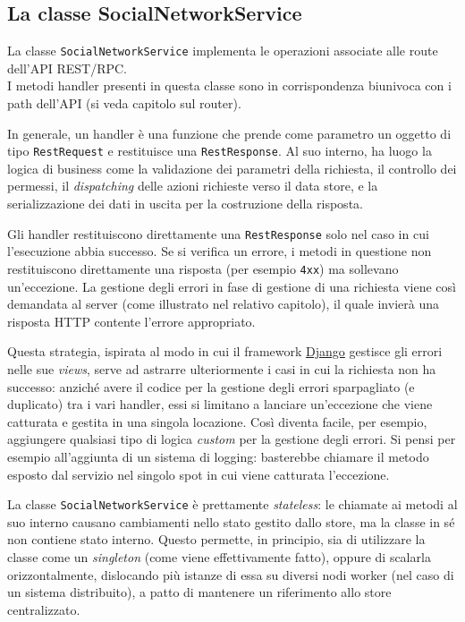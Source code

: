 \documentclass[a4paper,8pt]{article} %
\def\code#1{\texttt{#1}}
\begin{document}
\subsection{La classe SocialNetworkService}
La classe \code{SocialNetworkService} implementa le operazioni associate alle route dell'API REST/RPC.\\ I metodi handler presenti in questa classe
sono in corrispondenza biunivoca con i path dell'API (si veda capitolo sul router).

\par In generale, un handler è una funzione che prende come parametro un oggetto di tipo \code{RestRequest} e restituisce una \code{RestResponse}. Al suo interno,
ha luogo la logica di business come la validazione dei parametri della richiesta, il controllo dei permessi, il \emph{dispatching} delle azioni richieste verso il data store, e la
serializzazione dei dati in uscita per la costruzione della risposta.

\par Gli handler restituiscono direttamente una \code{RestResponse} solo nel caso in cui l'esecuzione abbia successo. Se si verifica un errore, i metodi in questione non restituiscono
direttamente una risposta (per esempio \code{4xx}) ma sollevano un'eccezione. La gestione degli errori in fase di gestione di una richiesta viene così demandata
al server (come illustrato nel relativo capitolo), il quale invierà una risposta HTTP contente l'errore appropriato.
\par Questa strategia, ispirata al modo in cui il framework \href{https://www.djangoproject.com/}{Django} gestisce gli errori nelle sue \emph{views}, serve ad astrarre ulteriormente i casi in cui la richiesta non ha successo:
anziché avere il codice per la gestione degli errori sparpagliato (e duplicato) tra i vari handler, essi si limitano a lanciare un'eccezione che viene catturata e gestita in una singola locazione.
Così diventa
facile, per esempio, aggiungere qualsiasi tipo di logica \emph{custom} per la gestione degli errori. Si pensi per esempio all'aggiunta di un sistema di logging: basterebbe chiamare il metodo esposto dal servizio nel singolo spot in cui
viene catturata l'eccezione.

\par La classe \code{SocialNetworkService} è prettamente \emph{stateless}: le chiamate ai metodi al suo interno causano cambiamenti nello stato gestito dallo store, ma la classe
in sé non contiene stato interno. Questo permette, in principio, sia di utilizzare la classe come un \emph{singleton} (come viene effettivamente fatto), oppure di scalarla
orizzontalmente, dislocando più istanze di essa su diversi nodi worker (nel caso di un sistema distribuito), a patto di mantenere un riferimento allo store centralizzato.
\end{document}

